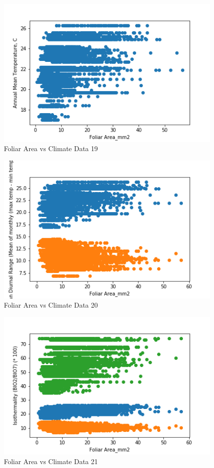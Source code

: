\documentclass[letterpaper]{article}
\begin{document}
\begin{figure}[h]
\caption{Foliar Area vs Climate Data 19\label{fig:Foliar_Area_vs_19}}
\centering
\includegraphics[width=0.7\paperwidth]{Foliar_Area_vs_19}
\end{figure}


\begin{figure}[h]
\caption{Foliar Area vs Climate Data 20\label{fig:Foliar_Area_vs_20}}
\centering
\includegraphics[width=0.7\paperwidth]{Foliar_Area_vs_20}
\end{figure}


\begin{figure}[h]
\caption{Foliar Area vs Climate Data 21\label{fig:Foliar_Area_vs_21}}
\centering
\includegraphics[width=0.7\paperwidth]{Foliar_Area_vs_21}
\end{figure}
\end{document}
